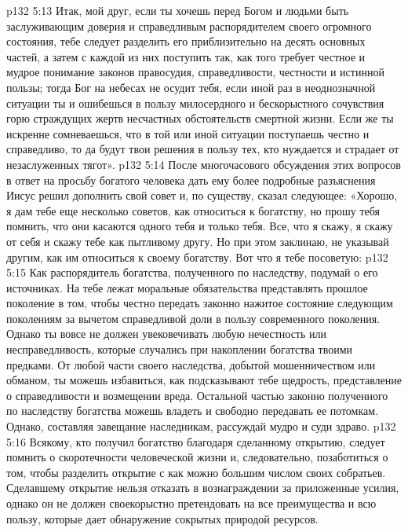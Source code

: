 \vs p132 5:13 \pc Итак, мой друг, если ты хочешь перед Богом и людьми быть заслуживающим доверия и справедливым распорядителем своего огромного состояния, тебе следует разделить его приблизительно на десять основных частей, а затем с каждой из них поступить так, как того требует честное и мудрое понимание законов правосудия, справедливости, честности и истинной пользы; тогда Бог на небесах не осудит тебя, если иной раз в неоднозначной ситуации ты и ошибешься в пользу милосердного и бескорыстного сочувствия горю страждущих жертв несчастных обстоятельств смертной жизни. Если же ты искренне сомневаешься, что в той или иной ситуации поступаешь честно и справедливо, то да будут твои решения в пользу тех, кто нуждается и страдает от незаслуженных тягот».
\vs p132 5:14 После многочасового обсуждения этих вопросов в ответ на просьбу богатого человека дать ему более подробные разъяснения Иисус решил дополнить свой совет и, по существу, сказал следующее: «Хорошо, я дам тебе еще несколько советов, как относиться к богатству, но прошу тебя помнить, что они касаются одного тебя и только тебя. Все, что я скажу, я скажу от себя и скажу тебе как пытливому другу. Но при этом заклинаю, не указывай другим, как им относиться к своему богатству. Вот что я тебе посоветую:
\vs p132 5:15 \pc {}\bibnobreakspace Как распорядитель богатства, полученного по наследству, подумай о его источниках. На тебе лежат моральные обязательства представлять прошлое поколение в том, чтобы честно передать законно нажитое состояние следующим поколениям за вычетом справедливой доли в пользу современного поколения. Однако ты вовсе не должен увековечивать любую нечестность или несправедливость, которые случались при накоплении богатства твоими предками. От любой части своего наследства, добытой мошенничеством или обманом, ты можешь избавиться, как подсказывают тебе щедрость, представление о справедливости и возмещении вреда. Остальной частью законно полученного по наследству богатства можешь владеть и свободно передавать ее потомкам. Однако, составляя завещание наследникам, рассуждай мудро и суди здраво.
\vs p132 5:16 \pc {}\bibnobreakspace Всякому, кто получил богатство благодаря сделанному открытию, следует помнить о скоротечности человеческой жизни и, следовательно, позаботиться о том, чтобы разделить открытие с как можно большим числом своих собратьев. Сделавшему открытие нельзя отказать в вознаграждении за приложенные усилия, однако он не должен своекорыстно претендовать на все преимущества и всю пользу, которые дает обнаружение сокрытых природой ресурсов.
